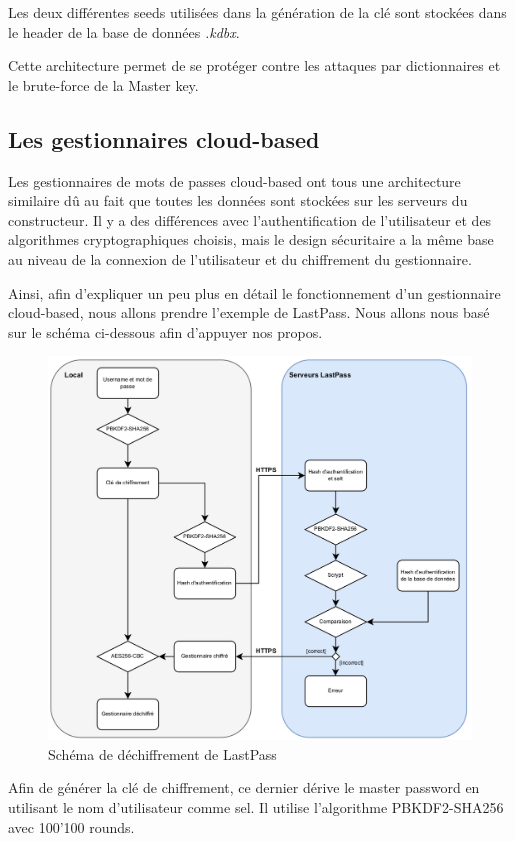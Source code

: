 Les deux différentes seeds utilisées dans la génération de la clé sont stockées dans le header de la base de données \textit{.kdbx}.

Cette architecture permet de se protéger contre les attaques par dictionnaires et le brute-force de la Master key.

\subsection{Les gestionnaires cloud-based}
Les gestionnaires de mots de passes cloud-based ont tous une architecture similaire dû au fait que toutes les données sont stockées sur les serveurs du constructeur. Il y a des différences avec l'authentification de l'utilisateur et des algorithmes cryptographiques choisis, mais le design sécuritaire a la même base au niveau de la connexion de l'utilisateur et du chiffrement du gestionnaire. 

Ainsi, afin d'expliquer un peu plus en détail le fonctionnement d'un gestionnaire cloud-based, nous allons prendre l'exemple de LastPass. Nous allons nous basé sur le schéma ci-dessous afin d'appuyer nos propos.
\begin{figure}[h!]
	\includegraphics[width=15.5cm]{images/lastpass_encr.png}
	\centering
	\caption{Schéma de déchiffrement de LastPass}
\end{figure}

Afin de générer la clé de chiffrement, ce dernier dérive le master password en utilisant le nom d'utilisateur comme sel. Il utilise l'algorithme PBKDF2-SHA256 avec 100'100 rounds. 
